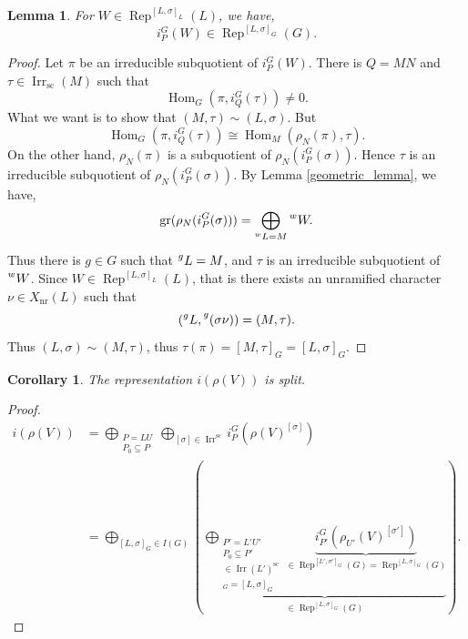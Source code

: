 \documentclass[8pt]{article}
\newtheorem{lemma}{Lemma}[section]
\newtheorem{corollary}{Corollary} [section]
\DeclareMathOperator{\Rep}{Rep}
\DeclareMathOperator{\Hom}{Hom}
\DeclareMathOperator{\gr}{gr}
\DeclareMathOperator{\supcus}{sc}
\DeclareMathOperator{\Irr}{Irr}
\DeclareMathOperator{\nr}{nr}
\begin{document}
\begin{lemma}
  \label{lemma_89}
  For $W\in\Rep^{[L,\sigma]_L}(L)$, we have, 
  \begin{equation*}
    i_P^G(W)\in\Rep^{[L,\sigma]_G}(G).
  \end{equation*}
\end{lemma}
\begin{proof}
  Let $\pi$ be an irreducible subquotient of $i_P^G(W)$. There is $Q=MN$ and $\tau\in\Irr_{\supcus}(M)$ such that 
  \begin{equation*}
    \Hom_G(\pi,i_Q^G(\tau))\not=0.
  \end{equation*}
  What we want is to show that $(M,\tau)\sim (L,\sigma)$. But 
  \begin{equation*}
    \Hom_G(\pi,i_Q^G(\tau)) \cong \Hom_M(\rho_N(\pi),\tau).
  \end{equation*}
  On the other hand, $\rho_N(\pi)$ is a subquotient of $\rho_N(i_P^G(\sigma))$. Hence $\tau$ is an irreducible subquotient of $\rho_N(i_P^G(\sigma))$. By Lemma \ref{geometric_lemma}, we have,
  \begin{equation*}
    \gr(\rho_N(i_P^G(\sigma))) = \bigoplus_{\prescript{w}{}{L}=M}\prescript{w}{}{W}.
  \end{equation*}
  Thus there is $g\in G$ such that $\prescript{g}{}{L} = M$, and $\tau$ is an irreducible subquotient of $\prescript{w}{}{W}$. Since $W\in\Rep^{[L,\sigma]_L}(L)$, that is there exists an unramified character $\nu\in X_{\nr}(L)$ such that 
  \begin{equation*}
    (\prescript{g}{}{L},\prescript{g}{}{(\sigma\nu)}) = (M,\tau).
  \end{equation*}
  Thus $(L,\sigma)\sim (M,\tau)$, thus $\tau(\pi)=[M,\tau]_G=[L,\sigma]_G$.
\end{proof}

\begin{corollary}
  \label{corollary_90}
  The representation $i(\rho(V))$ is split. 
\end{corollary}

\begin{proof}
  
  \begin{align*}
    i(\rho(V)) & = \bigoplus_{\substack{P=LU\\ P_0\subseteq P}}\bigoplus_{[\sigma]\in\Irr^{\supcus}}i_P^G(\rho(V)^{[\sigma]})\\
    & = \bigoplus_{[L,\sigma]_G\in I(G)}\left(\underbrace{\bigoplus_{\substack{P'=L'U'\\ P_0\subseteq P'\\ [\sigma']\in\Irr(L')^{\supcus}\\ [L',\sigma']_G=[L,\sigma]_G}}\underbrace{i_{P'}^G(\rho_{U'}(V)^{[\sigma']})}_{\in\Rep^{[L',\sigma']_G}(G)=\Rep^{[L,\sigma]_G}(G)}}_{\in\Rep^{[L,\sigma]_G}(G)}\right).
  \end{align*}
\end{proof}
\end{document}
